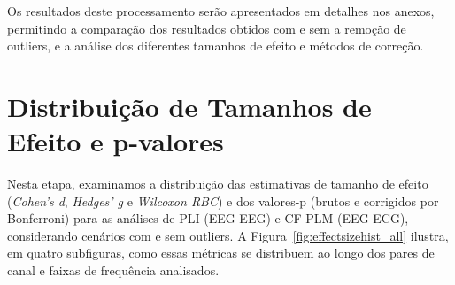 Os resultados deste processamento serão apresentados em detalhes nos anexos, permitindo a comparação dos resultados obtidos com e sem a remoção de outliers, e a análise dos diferentes tamanhos de efeito e métodos de correção.

\section{Distribuição de Tamanhos de Efeito e p-valores}
\label{sec:effect_size_distribution}

Nesta etapa, examinamos a distribuição das estimativas de tamanho de efeito (\emph{Cohen's d}, \emph{Hedges' g} e \emph{Wilcoxon RBC}) e dos valores-p (brutos e corrigidos por Bonferroni) para as análises de PLI (EEG-EEG) e CF-PLM (EEG-ECG), considerando cenários com e sem outliers. A Figura~\ref{fig:effectsizehist_all} ilustra, em quatro subfiguras, como essas métricas se distribuem ao longo dos pares de canal e faixas de frequência analisados.

